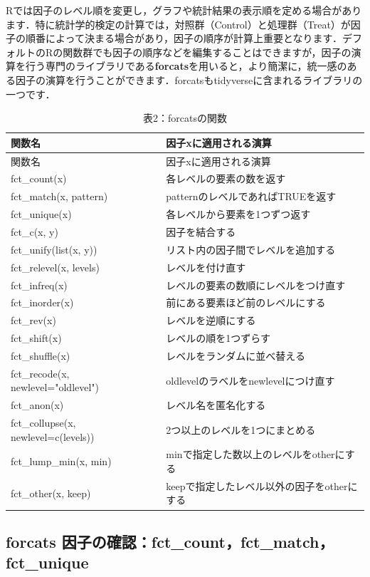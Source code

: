 \documentclass[
  letterpaper,
  DIV=11,
  numbers=noendperiod]{scrreprt}
\begin{document}
Rでは因子のレベル順を変更し，グラフや統計結果の表示順を定める場合があります．特に統計学的検定の計算では，対照群（Control）と処理群（Treat）が因子の順番によって決まる場合があり，因子の順序が計算上重要となります．デフォルトのRの関数群でも因子の順序などを編集することはできますが，因子の演算を行う専門のライブラリである\textbf{forcats}を用いると，より簡潔に，統一感のある因子の演算を行うことができます．forcatsもtidyverseに含まれるライブラリの一つです．

\begin{longtable}[]{@{}ll@{}}
\caption{表2：forcatsの関数}\tabularnewline
\toprule()
関数名 & 因子xに適用される演算 \\
\midrule()
\endfirsthead
\toprule()
関数名 & 因子xに適用される演算 \\
\midrule()
\endhead
fct\_count(x) & 各レベルの要素の数を返す \\
fct\_match(x, pattern) & patternのレベルであればTRUEを返す \\
fct\_unique(x) & 各レベルから要素を1つずつ返す \\
fct\_c(x, y) & 因子を結合する \\
fct\_unify(list(x, y)) & リスト内の因子間でレベルを追加する \\
fct\_relevel(x, levels) & レベルを付け直す \\
fct\_infreq(x) & レベルの要素の数順にレベルをつけ直す \\
fct\_inorder(x) & 前にある要素ほど前のレベルにする \\
fct\_rev(x) & レベルを逆順にする \\
fct\_shift(x) & レベルの順を1つずらす \\
fct\_shuffle(x) & レベルをランダムに並べ替える \\
fct\_recode(x, newlevel="oldlevel") &
oldlevelのラベルをnewlevelにつけ直す \\
fct\_anon(x) & レベル名を匿名化する \\
fct\_collupse(x, newlevel=c(levels)) & 2つ以上のレベルを1つにまとめる \\
fct\_lump\_min(x, min) & minで指定した数以上のレベルをotherにする \\
fct\_other(x, keep) & keepで指定したレベル以外の因子をotherにする \\
\bottomrule()
\end{longtable}

\hypertarget{forcats-ux56e0ux5b50ux306eux78baux8a8dfct_countfct_matchfct_unique}{%
\subsection{forcats
因子の確認：fct\_count，fct\_match，fct\_unique}\label{forcats-ux56e0ux5b50ux306eux78baux8a8dfct_countfct_matchfct_unique}}
\end{document}
